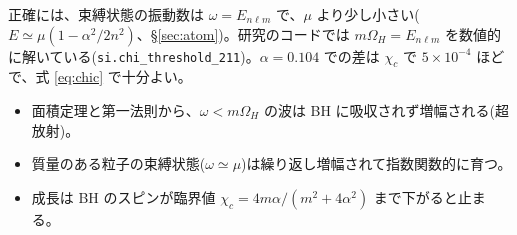 \begin{caution}
正確には、束縛状態の振動数は $\omega=E_{n\ell m}$ で、$\mu$ より少し小さい($E\simeq\mu(1-\alpha^2/2n^2)$、\S\ref{sec:atom})。研究のコードでは $m\Omega_H=E_{n\ell m}$ を数値的に解いている(\texttt{si.chi\_threshold\_211})。$\alpha=0.104$ での差は $\chi_c$ で $5\times10^{-4}$ ほどで、式 \eqref{eq:chic} で十分よい。
\end{caution}

\begin{summary}
\begin{itemize}
\item 面積定理と第一法則から、$\omega<m\Omega_H$ の波は BH に吸収されず増幅される(超放射)。
\item 質量のある粒子の束縛状態($\omega\simeq\mu$)は繰り返し増幅されて指数関数的に育つ。
\item 成長は BH のスピンが臨界値 $\chi_c=4m\alpha/(m^2+4\alpha^2)$ まで下がると止まる。
\end{itemize}
\end{summary}
